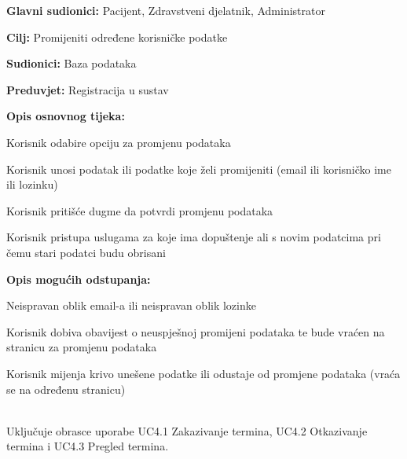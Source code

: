 \noindent {}
\begin{packed_item}
	
	\item \textbf{Glavni sudionici: }Pacijent, Zdravstveni djelatnik, Administrator
	\item  \textbf{Cilj:} Promijeniti određene korisničke podatke
	\item  \textbf{Sudionici:} Baza podataka
	\item  \textbf{Preduvjet:} Registracija u sustav
	\item  \textbf{Opis osnovnog tijeka:}
	
	\item[] \begin{packed_enum}
		
		\item Korisnik odabire opciju za promjenu podataka
		\item Korisnik unosi podatak ili podatke koje želi promijeniti (email ili korisničko ime ili lozinku)
		\item Korisnik pritišće dugme da potvrdi promjenu podataka
		\item Korisnik pristupa uslugama za koje ima dopuštenje ali s novim podatcima pri čemu stari podatci budu obrisani
	\end{packed_enum}
	
	\item  \textbf{Opis mogućih odstupanja:}
	
	\item[] \begin{packed_item}
		
		\item[2.a] Neispravan oblik email-a ili neispravan oblik lozinke
		\item[] \begin{packed_enum}
			
			\item Korisnik dobiva obavijest o neuspješnoj promijeni podataka te bude vraćen na stranicu za promjenu podataka
			\item Korisnik mijenja krivo unešene podatke ili odustaje od promjene podataka (vraća se na određenu stranicu)
			
		\end{packed_enum}
		
	\end{packed_item}
\end{packed_item}


\noindent {}\\
Uključuje obrasce uporabe UC4.1 Zakazivanje termina, UC4.2 Otkazivanje termina i UC4.3 Pregled termina.\\

